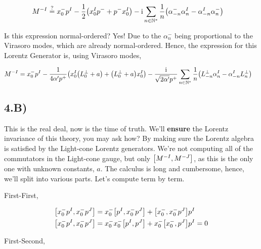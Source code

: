 \begin{align*}
    M^{-I}&\stackrel{?}{=}x_0^- p^I-\frac12\qty(x_0^I p^-+p^-x_0^I)-\textnormal{i}\sum\limits_{n\in\mathbb N^\ast}\frac{1}{n}\qty(\alpha^-_{-n}\alpha^I_{n}-\alpha^I_{-n}\alpha^-_{n})
\end{align*}

Is this expression normal-ordered? Yes! Due to the $\alpha_n^-$ being proportional to the Virasoro modes, which are already normal-ordered. Hence, the expression for this 
Lorentz Generator is, using Virasoro modes,

\begin{align*}
    M^{-I}&=x_0^- p^I-\frac{1}{4\alpha'p^+}\qty(x_0^I\qty(L_0^\perp+a)+\qty(L_0^\perp+a)x_0^I)-\frac{\textnormal{i}}{\sqrt{2\alpha'}p^+}\sum\limits_{n\in\mathbb N^\ast}\frac{1}{n}\qty(L^\perp_{-n}\alpha^I_{n}-\alpha^I_{-n}L^\perp_n)
\end{align*}

\subsection{4.B)}

This is the real deal, now is the time of truth. We'll \textbf{ensure} the Lorentz invariance of this theory, you may ask how? 
By making sure the Lorentz algebra is satisfied by the Light-cone Lorentz generators. We're not computing all of the commutators in 
the Light-cone gauge, but only $\comm{M^{-I}}{M^{-J}}$, as this is the only one with unknown constants, $a$. The calculus is long and 
cumbersome, hence, we'll split into various parts. Let's compute term by term.

First-First,

\begin{align*}
    \comm{x^-_0p^I}{x_0^-p^J}&=x^-_0\comm{p^I}{x_0^-p^J}+\comm{x^-_0}{x_0^-p^J}p^I\\
    \comm{x^-_0p^I}{x_0^-p^J}&=x^-_0x_0^-\comm{p^I}{p^J}+x_0^-\comm{x^-_0}{p^J}p^I=0
\end{align*}

First-Second,

